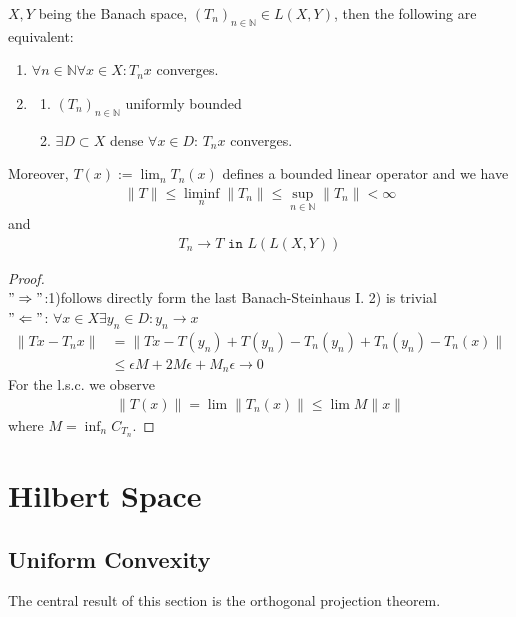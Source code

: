 \begin{theorem}
	$X, Y$ being the Banach space, $(T_n)_{n \in \mathbb{N}} \in L(X, Y)$, then the following are equivalent:
	\begin{enumerate}
		\item $\forall n \in \mathbb{N} \forall x \in X: T_n x$ converges.
		\item 
		\begin{enumerate}
			\item $(T_n)_{n \in \mathbb{N}}$ uniformly bounded
			\item $\exists D \subset X$ dense $\forall x \in D$: $T_n x $ converges. 
		\end{enumerate}  
	\end{enumerate}
	Moreover, $T(x) := \lim_n T_n(x)$ defines a bounded linear operator and we have
	\begin{align*}
		\|T\| \le \liminf_n\|T_n\| \le \sup_{n \in \mathbb{N}}\|T_n\| < \infty
	\end{align*}
	and 
	\begin{align*}
		T_n \rightarrow T  \texttt{ in } L(L(X, Y))
	\end{align*}
\end{theorem}
\begin{proof}\quad\\
$"\Rightarrow"$:1)follows directly form the last Banach-Steinhaus I. 2) is trivial \\
$"\Leftarrow"$: $\forall x \in X \exists y_n \in D:y_n \rightarrow x$
\begin{align*}
	\|Tx - T_n x\| &= \|Tx - T(y_n) + T(y_n) - T_n(y_n) + T_n(y_n) - T_n(x)\|\\
	&\le \epsilon M  + 2M \epsilon + M_n \epsilon \rightarrow 0
\end{align*}
For the l.s.c. we observe
\begin{align*}
	\|T(x)\| = \lim\|T_n(x)\| \le \lim M \|x\|
\end{align*}
where $M = \inf_n C_{T_n}$. 
\end{proof}






\newpage
\section{Hilbert Space}
\subsection{Uniform Convexity}
The central result of this section is the orthogonal projection theorem.

